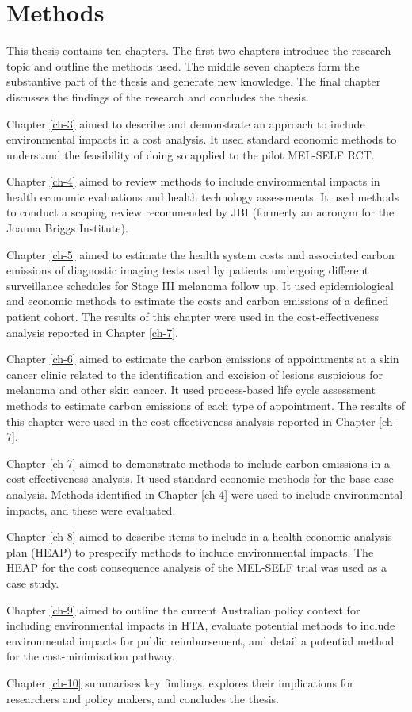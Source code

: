 \chapter{Methods}
\label{ch-2}

This thesis contains ten chapters. The first two chapters introduce the research topic and outline the methods used. The middle seven chapters form the substantive part of the thesis and generate new knowledge. The final chapter discusses the findings of the research and concludes the thesis.

Chapter \ref{ch-3} aimed to describe and demonstrate an approach to include environmental impacts in a cost analysis. It used standard economic methods to understand the feasibility of doing so applied to the pilot MEL-SELF RCT. 

Chapter \ref{ch-4} aimed to review methods to include environmental impacts in health economic evaluations and health technology assessments. It used methods to conduct a scoping review recommended by JBI (formerly an acronym for the Joanna Briggs Institute).

Chapter \ref{ch-5} aimed to estimate the health system costs and associated carbon emissions of diagnostic imaging tests used by patients undergoing different surveillance schedules for Stage III melanoma follow up. It used epidemiological and economic methods to estimate the costs and carbon emissions of a defined patient cohort. The results of this chapter were used in the cost-effectiveness analysis reported in Chapter \ref{ch-7}.

Chapter \ref{ch-6} aimed to estimate the carbon emissions of appointments at a skin cancer clinic related to the identification and excision of lesions suspicious for melanoma and other skin cancer. It used process-based life cycle assessment methods to estimate carbon emissions of each type of appointment. The results of this chapter were used in the cost-effectiveness analysis reported in Chapter \ref{ch-7}.

Chapter \ref{ch-7} aimed to demonstrate methods to include carbon emissions in a cost-effectiveness analysis. It used standard economic methods for the base case analysis. Methods identified in Chapter \ref{ch-4} were used to include environmental impacts, and these were evaluated. 

Chapter \ref{ch-8} aimed to describe items to include in a health economic analysis plan (HEAP) to prespecify methods to include environmental impacts. The HEAP for the cost consequence analysis of the MEL-SELF trial was used as a case study. 

Chapter \ref{ch-9} aimed to outline the current Australian policy context for including environmental impacts in HTA, evaluate potential methods to include environmental impacts for public reimbursement, and detail a potential method for the cost-minimisation pathway. 

Chapter \ref{ch-10} summarises key findings, explores their implications for researchers and policy makers, and concludes the thesis.